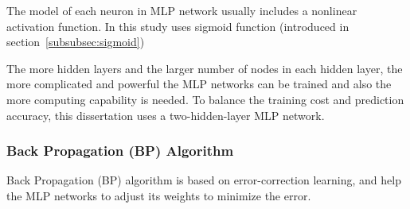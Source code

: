 The model of each neuron in MLP network usually includes a nonlinear activation function. In this study uses sigmoid function (introduced in section~\ref{subsubsec:sigmoid})

The more hidden layers and the larger number of nodes in each hidden layer, the more complicated and powerful the MLP networks can be trained and also the more computing capability is needed. To balance the training cost and prediction accuracy, this dissertation uses a two-hidden-layer MLP network.

\subsubsection{Back Propagation (BP) Algorithm}
Back Propagation (BP) algorithm is based on error-correction learning, and help the MLP networks to adjust its weights to minimize the error\cite[p.~214--218]{4_kantardzic}.\\

